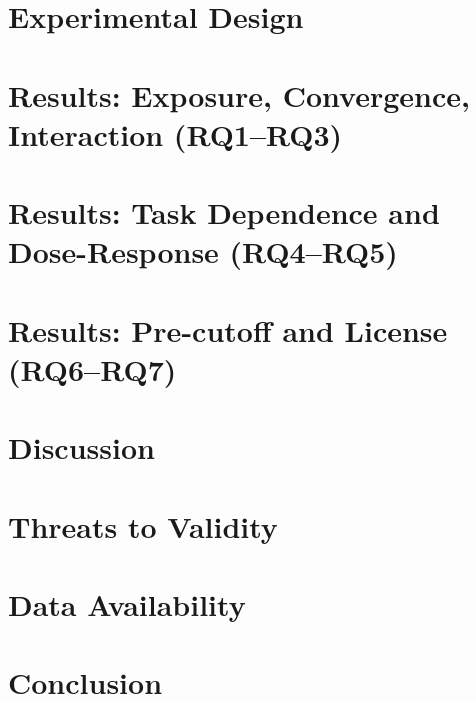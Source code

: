 \documentclass[sigconf,anonymous,review]{acmart}
\begin{document}
\section{Experimental Design}           %

\section{Results: Exposure, Convergence, Interaction (RQ1--RQ3)}  %

\section{Results: Task Dependence and Dose-Response (RQ4--RQ5)}   %

\section{Results: Pre-cutoff and License (RQ6--RQ7)}             %

\section{Discussion}                    %

\section{Threats to Validity}           %

\section{Data Availability}

\section{Conclusion}                    %



\end{document}
